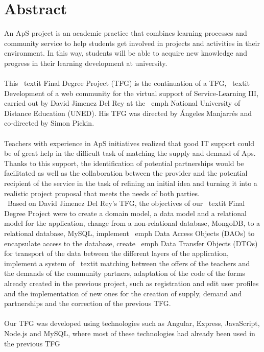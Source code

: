 \documentclass[11pt]{book}
\begin{document}
\chapter*{Abstract} 
An ApS project is an academic practice that combines learning processes and community service to help students get involved in projects and activities in their environment. In this way, students will be able to acquire new knowledge and progress in their learning development at university. \\\\
This \ textit {Final Degree Project} (TFG) is the continuation of a TFG, \ textit {Development of a web community for the virtual support of Service-Learning III}, carried out by David Jimenez Del Rey at the \ emph { National University of Distance Education} (UNED). His TFG was directed by Ángeles Manjarrés and co-directed by Simon Pickin. \\\\
Teachers with experience in ApS initiatives realized that good IT support could be of great help in the difficult task of matching the supply and demand of Aps. Thanks to this support, the identification of potential partnerships would be facilitated as well as the collaboration between the provider and the potential recipient of the service in the task of refining an initial idea and turning it into a realistic project proposal that meets the needs of both parties. \ \\\
Based on David Jimenez Del Rey's TFG, the objectives of our \ textit {Final Degree Project} were to create a domain model, a data model and a relational model for the application, change from a non-relational database, MongoDB, to a relational database, MySQL, implement \ emph {Data Access Objects} (DAOs) to encapsulate access to the database, create \ emph {Data Transfer Objects} (DTOs) for transport of the data between the different layers of the application, implement a system of \ textit {matching} between the offers of the teachers and the demands of the community partners, adaptation of the code of the forms already created in the previous project, such as registration and edit user profiles and the implementation of new ones for the creation of supply, demand and partnerships and the correction of the previous TFG. \\\\
Our TFG was developed using technologies such as Angular, Express, JavaScript, Node.js and MySQL, where most of these technologies had already been used in the previous TFG \\\\
\addcontentsline{toc}{chapter}{Abstract} 
\end{document}
